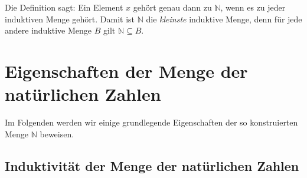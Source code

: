 \documentclass[main.tex]{subfiles}
\begin{document}
\begin{remark}
  Die Definition sagt: Ein Element \(x\) gehört genau dann zu \(\mathbb{N}\), wenn es zu jeder induktiven Menge gehört.  Damit ist \(\mathbb{N}\) die \emph{kleinste} induktive Menge, denn für jede andere induktive Menge \(B\) gilt \(\mathbb{N} \subseteq B\).
\end{remark}

\begin{tabproofwide}
\end{tabproofwide}

\section{Eigenschaften der Menge der natürlichen Zahlen}

Im Folgenden werden wir einige grundlegende Eigenschaften der so konstruierten Menge \(\mathbb{N}\) beweisen.

\subsection{Induktivität der Menge der natürlichen Zahlen}


\begin{tabproof}
\end{tabproof}
\end{document}
